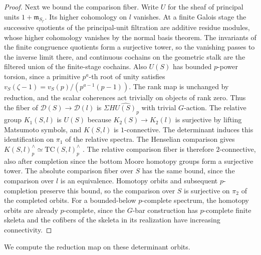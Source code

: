 \begin{proof}
Next we bound the comparison fiber.
Write $U$ for the sheaf of principal units $1+\mathfrak m_{S_{l'}}$.
Its higher cohomology on $l$ vanishes.
At a finite Galois stage the successive quotients of the principal-unit filtration are additive residue modules, whose higher cohomology vanishes by the normal basis theorem.
The invariants of the finite congruence quotients form a surjective tower, so the vanishing passes to the inverse limit there, and continuous cochains on the geometric stalk are the filtered union of the finite-stage cochains.
Also $U(S)$ has bounded $p$-power torsion, since a primitive $p^a$-th root of unity satisfies
$v_S(\zeta-1)=v_S(p)/(p^{a-1}(p-1))$.
The rank map is unchanged by reduction, and the scalar coherences act trivially on objects of rank zero.
Thus the fiber of $\mathcal D(S)\to\mathcal D(l)$ is $\Sigma H\widehat{U(S)}_p$ with trivial $G$-action.
The relative group $K_1(S,l)$ is $U(S)$ because $K_2(S)\to K_2(l)$ is surjective by lifting Matsumoto symbols, and $K(S,l)$ is $1$-connective.
The determinant induces this identification on $\pi_1$ of the relative spectra.
The Henselian comparison gives $K(S,l)^\wedge_p\simeq \mathrm{TC}(S,l)^\wedge_p$ \cite[Theorem 4.36]{ClausenMathewMorrow}.
The relative comparison fiber is therefore $2$-connective, also after completion since the bottom Moore homotopy groups form a surjective tower.
The absolute comparison fiber over $S$ has the same bound, since the comparison over $l$ is an equivalence.
Homotopy orbits and subsequent $p$-completion preserve this bound, so the comparison over $S$ is surjective on $\pi_2$ of the completed orbits.
For a bounded-below $p$-complete spectrum, the homotopy orbits are already $p$-complete, since the $G$-bar construction has $p$-complete finite skeleta and the cofibers of the skeleta in its realization have increasing connectivity.
\end{proof}

We compute the reduction map on these determinant orbits.

